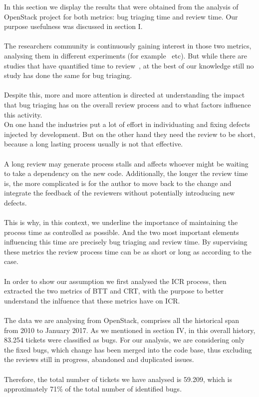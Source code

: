 \documentclass[10pt, conference]{IEEEtran}
\begin{document}
In this section we display the results that were obtained from the analysis 
of OpenStack project for both metrics: bug triaging time and review time. 
Our purpose usefulness was discussed in section I.
\\ \\
The researchers community is continuously gaining interest in those two metrics, 
analysing them in different experiments (for example~\cite{bib01,bib02,bib03,bib019,bib021} etc). 
But while there are studies that have quantified time to review~\cite{bib01,bib02}, at the best 
of our knowledge still no study has done the same for bug triaging.
\\ \\
Despite this, more and more attention is directed at understanding the impact that bug triaging 
has on the overall review process and to what factors influence this activity.
\\ %
On one hand the industries put a lot of effort in individuating and fixing 
defects injected by development. But on the other hand they need the review to be short, 
because a long lasting process usually is not that effective. 
\\ \\
A long review may generate process stalls and affects whoever might be waiting to take 
a dependency on the new code.
Additionally, the longer the review time is, the more complicated is for the author to move back to 
the change and integrate the feedback of the reviewers without potentially introducing new defects. 
\\ \\
This is why, in this context, we underline the importance of maintaining the process time as 
controlled as possible. And the two most important elements influencing this time are precisely 
bug triaging and review time. By supervising these metrics the review process time can be as 
short or long as according to the case. 
\\ %
\\
In order to show our assumption we first analysed the ICR process, 
then extracted the two metrics of BTT and CRT, with the purpose to better 
understand the inlfuence that these metrics have on ICR.
\\
\\
The data we are analysing from OpenStack, comprises all the historical span from 2010 to January 2017. 
As we mentioned in section IV, in this overall history, 83.254 tickets were classified as bugs. 
For our analysis, we are considering 
only the fixed bugs, which change has been merged into the code base, thus excluding the reviews still in 
progress, abandoned and duplicated issues. 
\\
\\Therefore, the total number of tickets we have analysed is 59.209, which is approximately 71\% of the total 
number of identified bugs. 
\end{document}
